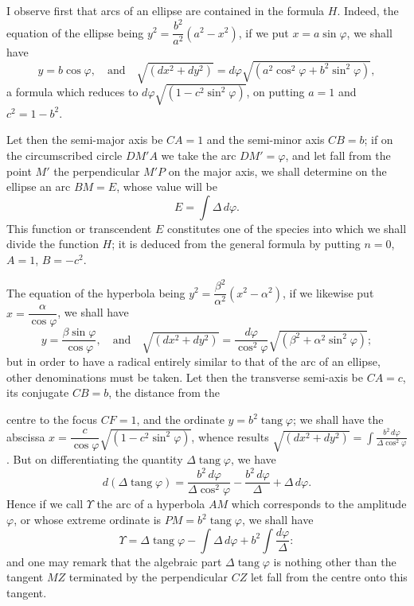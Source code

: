 \documentclass{article}
\begin{document}
I observe first that arcs of an ellipse are contained in the formula $H$. Indeed, the equation of the ellipse being $y^{2}=\dfrac{b^{2}}{a^{2}}(a^{2}-x^{2})$, if we put $x=a\sin\varphi$, we shall have
\[ y=b\cos\varphi,\quad\text{and}\quad\sqrt{(dx^{2}+dy^{2})}=d\varphi\sqrt{(a^{2}\cos^{2}\varphi+b^{2}\sin^{2}\varphi)}, \]
a formula which reduces to $d\varphi\sqrt{(1-c^{2}\sin^{2}\varphi)}$, on putting $a=1$ and $c^{2}=1-b^{2}$.


Let then the semi-major axis be $CA=1$ and the semi-minor axis $CB=b$; if on the circumscribed circle $DM'A$ we take the arc $DM'=\varphi$, and let fall from the point $M'$ the perpendicular $M'P$ on the major axis, we shall determine on the ellipse an arc $BM=E$, whose value will be
\[ E=\int\Delta\,d\varphi. \]
This function or transcendent $E$ constitutes one of the species into which we shall divide the function $H$; it is deduced from the general formula by putting $n=0$, $A=1$, $B=-c^{2}$.


The equation of the hyperbola being $y^{2}=\dfrac{\beta^{2}}{\alpha^{2}}(x^{2}-\alpha^{2})$, if we likewise put $x=\dfrac{\alpha}{\cos\varphi}$, we shall have
\[ y=\frac{\beta\sin\varphi}{\cos\varphi},\quad\text{and}\quad\sqrt{(dx^{2}+dy^{2})}=\frac{d\varphi}{\cos^{2}\varphi}\sqrt{(\beta^{2}+\alpha^{2}\sin^{2}\varphi)}; \]
but in order to have a radical entirely similar to that of the arc of an ellipse, other denominations must be taken. Let then the transverse semi-axis be $CA=c$, its conjugate $CB=b$, the distance from the

centre to the focus $CF=1$, and the ordinate $y=b^{2}\operatorname{tang}\varphi$; we shall have the abscissa $x=\dfrac{c}{\cos\varphi}\sqrt{(1-c^{2}\sin^{2}\varphi)}$, whence results $\sqrt{(dx^{2}+dy^{2})}=\displaystyle\int\frac{b^{2}\,d\varphi}{\Delta\cos^{2}\varphi}$. But on differentiating the quantity $\Delta\operatorname{tang}\varphi$, we have
\[ d(\Delta\operatorname{tang}\varphi)=\frac{b^{2}\,d\varphi}{\Delta\cos^{2}\varphi}-\frac{b^{2}\,d\varphi}{\Delta}+\Delta\,d\varphi. \]
Hence if we call $\Upsilon$ the arc of a hyperbola $AM$ which corresponds to the amplitude $\varphi$, or whose extreme ordinate is $PM=b^{2}\operatorname{tang}\varphi$, we shall have
\[ \Upsilon=\Delta\operatorname{tang}\varphi-\int\Delta\,d\varphi+b^{2}\int\frac{d\varphi}{\Delta}: \]
and one may remark that the algebraic part $\Delta\operatorname{tang}\varphi$ is nothing other than the tangent $MZ$ terminated by the perpendicular $CZ$ let fall from the centre onto this tangent.
\end{document}
